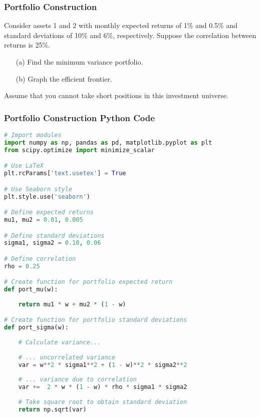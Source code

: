 \documentclass{beamer}
\begin{document}
\begin{frame}
\frametitle{Portfolio Construction}
\begin{Example}
Consider assets 1 and 2 with monthly expected returns of 1\% and 0.5\% and standard deviations of 10\% and 6\%, respectively. Suppose the correlation between returns is 25\%.
\begin{enumerate}
\item[(a)] Find the minimum variance portfolio.
\item[(b)] Graph the efficient frontier.
\end{enumerate}
Assume that you cannot take short positions in this investment universe.
\end{Example}

\end{frame}

\begin{frame}[fragile]
\frametitle{Portfolio Construction Python Code}

\begin{lstlisting}[language=Python]
# Import modules
import numpy as np, pandas as pd, matplotlib.pyplot as plt
from scipy.optimize import minimize_scalar

# Use LaTeX
plt.rcParams['text.usetex'] = True

# Use Seaborn style
plt.style.use('seaborn')

# Define expected returns
mu1, mu2 = 0.01, 0.005

# Define standard deviations
sigma1, sigma2 = 0.10, 0.06

# Define correlation
rho = 0.25

# Create function for portfolio expected return
def port_mu(w):
    
    return mu1 * w + mu2 * (1 - w)

# Create function for portfolio standard deviations
def port_sigma(w):
    
    # Calculate variance...
    
    # ... uncorrelated variance
    var = w**2 * sigma1**2 + (1 - w)**2 * sigma2**2 
    
    # ... variance due to correlation
    var +=  2 * w * (1 - w) * rho * sigma1 * sigma2
    
    # Take square root to obtain standard deviation
    return np.sqrt(var)
\end{lstlisting}

\end{frame}
\end{document}
